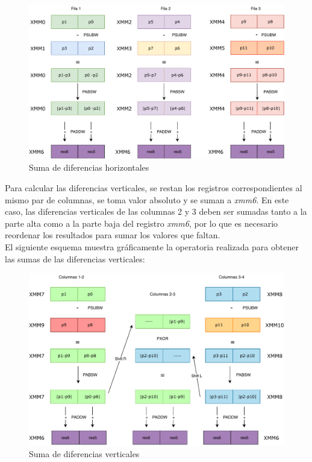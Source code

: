 \documentclass[a4paper]{article}
\begin{document}
\begin{itemize}
	\begin{figure}[h]
		\centering
		\includegraphics[scale=0.6]{img/sumHorizontalColorBordes.pdf}
		\caption{Suma de diferencias horizontales}
	\end{figure}

	Para calcular las diferencias verticales, se restan los registros correspondientes al mismo par de columnas, se toma valor absoluto y se suman a \textit{xmm6}. En este caso, las diferencias verticales de las columnas 2 y 3 deben ser sumadas tanto a la parte alta como a la parte baja del registro \textit{xmm6}, por lo que es necesario reordenar los resultados para sumar los valores que faltan. \\
	El siguiente esquema muestra gráficamente la operatoria realizada para obtener las sumas de las diferencias verticales:
	
	\begin{figure}[h]
		\centering
		\includegraphics[scale=0.6]{img/sumVerticalesColorBordes.pdf}
		\caption{Suma de diferencias verticales}
	\end{figure}
	   

\end{itemize}
\end{document}
